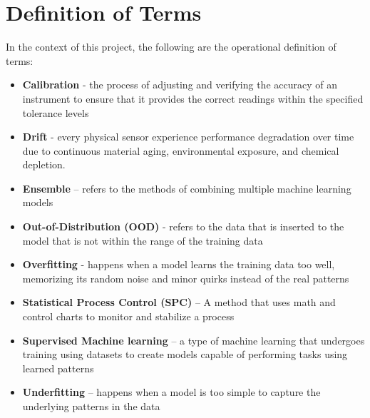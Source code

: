 \section{Definition of Terms}
In the context of this project, the following are the operational definition of terms:
\begin{itemize}
	\item \textbf{Calibration} - the process of adjusting and verifying the accuracy of an instrument to ensure that it provides the correct readings within the specified tolerance levels
	
	\item \textbf{Drift} - every physical sensor experience performance degradation over time due to continuous material aging, environmental exposure, and chemical depletion.
	
	\item \textbf{Ensemble} -- refers to the methods of combining multiple machine learning models
	
	\item \textbf{Out-of-Distribution (OOD)} - refers to the data that is inserted to the model that is not within the range of the training data
	
	\item \textbf{Overfitting} - happens when a model learns the training data too well, memorizing its random noise and minor quirks instead of the real patterns
	
	\item \textbf{Statistical Process Control (SPC)} -- A method that uses math and control charts to monitor and stabilize a process
	
	\item \textbf{Supervised Machine learning} -- a type of machine learning that undergoes training using datasets to create models capable of performing tasks using learned patterns
	
	\item \textbf{Underfitting} -- happens when a model is too simple to capture the underlying patterns in the data
\end{itemize}